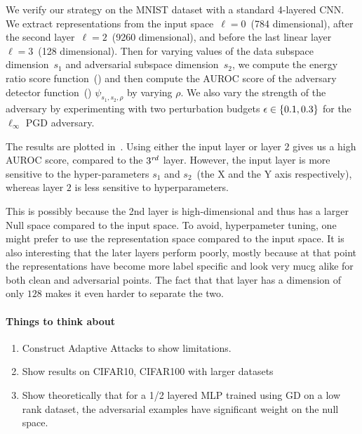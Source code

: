 We verify our strategy on the MNIST dataset with a standard 4-layered CNN. We
extract representations from the input space~\(\ell=0\)~(784 dimensional), after
the second layer~\(\ell=2\)~(9260 dimensional), and before the last linear
layer~\(\ell=3\)~(128 dimensional). Then for varying values of the data subspace
dimension~\(s_1\) and adversarial subspace dimension~\(s_2\), we compute the energy ratio score function~() and then compute the AUROC score of the adversary detector function~() \(\psi_{s_1, s_2, \rho} \)  by varying \(\rho\). We also vary the strength of the adversary by experimenting with two perturbation budgets \(\epsilon\in\left\{{0.1, 0.3}\right\}\) for the \(\ell_\infty\) PGD adversary.

The results are plotted in~. Using either the
input layer or layer \(2\) gives us a high AUROC score, compared to the \(3^{\it
rd}\) layer. However, the input layer is more sensitive to the hyper-parameters
\(s_1\) and \(s_2\)~(the X and the Y axis respectively), whereas layer \(2\) is
less sensitive to hyperparameters.

This is possibly because the 2nd layer is high-dimensional and thus has a larger Null space compared to the input space. To avoid, hyperpameter tuning, one might prefer to use the representation space compared to the input space. It is also interesting that the later layers perform poorly, mostly because at that point the representations have become more label specific and look very mucg alike for both clean and adversarial points. The fact that that layer has a dimension of only \(128\) makes it even harder to separate the two.

\paragraph{Things to think about}
\begin{enumerate}
  \item Construct Adaptive Attacks to show limitations.
  \item Show results on CIFAR10, CIFAR100 with larger datasets
  \item Show theoretically that for a 1/2 layered MLP trained using GD on a low rank dataset, the adversarial examples have significant weight on the null space.
\end{enumerate}

